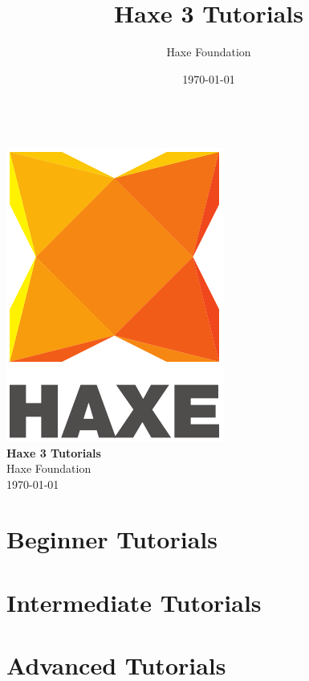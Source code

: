 \documentclass{../haxe}
\renewcommand{\maketitle}{
   \begin{titlepage}
     \setcounter{page}{-1}
			\begin{center}
				~\\[3cm]
				\includegraphics[scale=1.25]{../assets/logo.pdf}~\\[1cm]
				{\huge \bfseries Haxe 3 Tutorials}\\[7cm]
				Haxe Foundation\\
				\today
			\end{center}
   \end{titlepage}
}
\begin{document}
\title{Haxe 3 Tutorials}
\author{Haxe Foundation}
\date{\today}
\maketitle

\clearpage
\tableofcontents
\clearpage



\part{Beginner Tutorials}



\part{Intermediate Tutorials}
\part{Advanced Tutorials}
\end{document}
